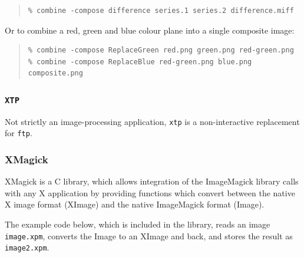 \documentclass[twoside,11pt]{article}
\newcommand{\htmladdnormallink}[2]{#1}
\begin{document}
\small
\begin{quote}
\begin{verbatim}
% combine -compose difference series.1 series.2 difference.miff
\end{verbatim}
\end{quote}
\normalsize

Or to combine a red, green and blue colour plane into a single composite image:

\small
\begin{quote}
\begin{verbatim}
% combine -compose ReplaceGreen red.png green.png red-green.png 
% combine -compose ReplaceBlue red-green.png blue.png composite.png
\end{verbatim}
\end{quote}
\normalsize

\subsubsection{{\tt XTP}}
 
Not strictly an image-processing application, {\tt xtp} is a
non-interactive replacement for {\tt ftp}.  
    
\subsubsection{XMagick}

\htmladdnormallink{XMagick}{http://siag.nu/xmagick/} is a C library,
which allows integration of the ImageMagick library calls with any X
application by providing functions which convert between the native X
image format (XImage) and the native ImageMagick format (Image).

The example code below, which is included in the library, reads an
image {\tt image.xpm}, converts the Image to an XImage and back, and
stores the result as {\tt image2.xpm}. 
\end{document}
